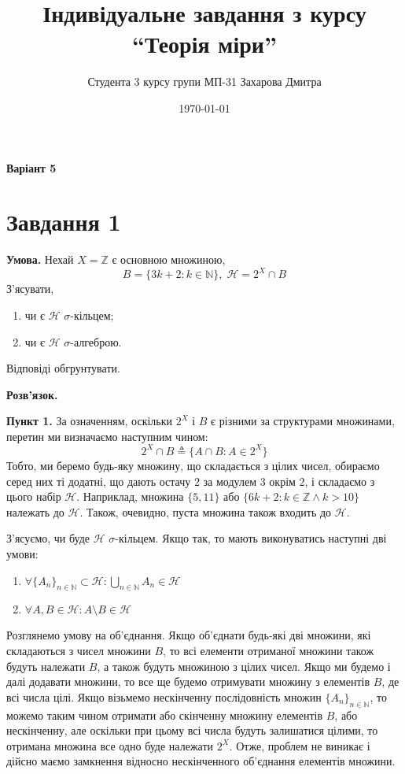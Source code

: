 \documentclass[14pt]{extarticle}
\title{Індивідуальне завдання з курсу ``Теорія міри''}
\author{Студента 3 курсу групи МП-31 Захарова Дмитра}
\date{\today}
\begin{document}
\maketitle

\textbf{Варіант 5}

\section*{Завдання 1}

\textbf{Умова.} Нехай $X = \mathbb{Z}$ є основною множиною,
\[
B = \{3k+2: k \in \mathbb{N}\}, \; \mathcal{H} = 2^X \cap B
\]
З'ясувати,
\begin{enumerate}
    \item чи є $\mathcal{H}$ $\sigma$-кільцем;
    \item чи є $\mathcal{H}$ $\sigma$-алгеброю.
\end{enumerate}
Відповіді обгрунтувати.

\textbf{Розв'язок.} 

\textbf{Пункт 1.} За означенням, оскільки $2^X$ і $B$ є різними за структурами множинами, перетин ми визначаємо наступним чином:
\[
2^X \cap B \triangleq \{A \cap B: A \in 2^X\}
\]
Тобто, ми беремо будь-яку множину, що складається з цілих чисел, обираємо серед них ті додатні, що дають остачу $2$ за модулем $3$ окрім $2$, і складаємо з цього набір $\mathcal{H}$. Наприклад, множина $\{5, 11\}$ або $\{6k+2: k \in \mathbb{Z} \wedge k > 10\}$ належать до $\mathcal{H}$. Також, очевидно, пуста множина також входить до $\mathcal{H}$.

З'ясуємо, чи буде $\mathcal{H}$ $\sigma$-кільцем. Якщо так, то мають виконуватись наступні дві умови:
\begin{enumerate}
    \item $\forall \{A_n\}_{n \in \mathbb{N}} \subset \mathcal{H}: \bigcup_{n \in \mathbb{N}}A_n \in \mathcal{H}$
    \item $\forall A, B \in \mathcal{H}: A \setminus B \in \mathcal{H}$
\end{enumerate}

Розглянемо умову на об'єднання. Якщо об'єднати будь-які дві множини, які складаються з чисел множини $B$, то всі елементи отриманої множини також будуть належати $B$, а також будуть множиною з цілих чисел. Якщо ми будемо і далі додавати множини, то все ще будемо отримувати множину з елементів $B$, де всі числа цілі. Якщо візьмемо нескінченну послідовність множин $\{A_n\}_{n \in \mathbb{N}}$, то можемо таким чином отримати або скінченну множину елементів $B$, або нескінченну, але оскільки при цьому всі числа будуть залишатися цілими, то отримана множина все одно буде належати $2^{X}$. Отже, проблем не виникає і дійсно маємо замкнення відносно нескінченного об'єднання елементів множини.
\end{document}
